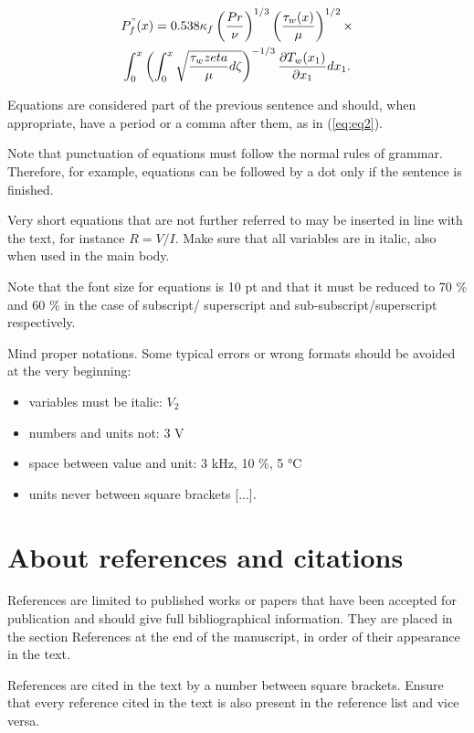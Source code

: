 \documentclass[final]{imeko_acta}
\begin{document}
\begin{multline}\label{eq:eq2}
	P^{"}_f(x) = 0.538\kappa_f \left(\frac{Pr}{\nu}\right)^{1/3}\left(\frac{\tau_w(x)}{\mu}\right)^{1/2} \times \\
	\int_{0}^{x} \left(\int_{0}^{x}\sqrt{\frac{\tau_w{zeta}}{\mu}d\zeta} \right)^{-1/3} \frac{\partial T_w(x_1)}{\partial x_1}dx_1.
\end{multline}

Equations are considered part of the previous sentence and should, when appropriate, have a period or a comma after them, as in (\ref{eq:eq2}).

Note that punctuation of equations must follow the normal rules of grammar. Therefore, for example, equations can be followed by a dot only if the sentence is finished.

Very short equations that are not further referred to may be inserted in line with the text, for instance $R = V/I$. Make sure that all variables are in italic, also when used in the main body. 

Note that the font size for equations is 10 pt and that it must be reduced to 70 \% and 60 \% in the case of subscript/ superscript and sub-subscript/superscript respectively.

Mind proper notations. Some typical errors or wrong formats 
should be avoided at the very beginning: 
\begin{itemize}
	\item variables must be italic: $V_2$
	\item numbers and units not: 3 V
	\item space between value and unit: 3 kHz, 10 \%, 5 °C
	\item units never between square brackets [...].
\end{itemize}

\section{About references and citations}

References are limited to published works or papers that have been accepted for publication and should give full bibliographical information. They are placed in the section References at the end of the manuscript, in order of their appearance in the text.

References are cited in the text by a number between square brackets. Ensure that every reference cited in the text is also present in the reference list and vice versa.
\end{document}
